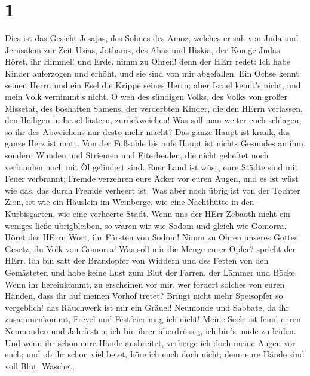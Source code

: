 \hypertarget{section}{%
\section{1}\label{section}}

 Dies ist das Gesicht Jesajas, des Sohnes des Amoz, welches
er sah von Juda und Jerusalem zur Zeit Usias, Jothams, des Ahas und
Hiskia, der Könige Judas.  Höret, ihr Himmel! und Erde, nimm
zu Ohren! denn der HErr redet: Ich habe Kinder auferzogen und erhöht,
und sie sind von mir abgefallen.  Ein Ochse kennt seinen
Herrn und ein Esel die Krippe seines Herrn; aber Israel kennt's nicht,
und mein Volk vernimmt's nicht.  O weh des sündigen Volks,
des Volks von großer Missetat, des boshaften Samens, der verderbten
Kinder, die den HErrn verlassen, den Heiligen in Israel lästern,
zurückweichen!  Was soll man weiter euch schlagen, so ihr
des Abweichens nur desto mehr macht? Das ganze Haupt ist krank, das
ganze Herz ist matt.  Von der Fußsohle bis aufs Haupt ist
nichts Gesundes an ihm, sondern Wunden und Striemen und Eiterbeulen, die
nicht geheftet noch verbunden noch mit Öl gelindert sind. 
Euer Land ist wüst, eure Städte sind mit Feuer verbrannt; Fremde
verzehren eure Äcker vor euren Augen, und es ist wüst wie das, das durch
Fremde verheert ist.  Was aber noch übrig ist von der
Tochter Zion, ist wie ein Häuslein im Weinberge, wie eine Nachthütte in
den Kürbisgärten, wie eine verheerte Stadt.  Wenn uns der
HErr Zebaoth nicht ein weniges ließe übrigbleiben, so wären wir wie
Sodom und gleich wie Gomorra.  Höret des HErrn Wort, ihr
Fürsten von Sodom! Nimm zu Ohren unseres Gottes Gesetz, du Volk von
Gomorra!  Was soll mir die Menge eurer Opfer? spricht der
HErr. Ich bin satt der Brandopfer von Widdern und des Fetten von den
Gemästeten und habe keine Lust zum Blut der Farren, der Lämmer und
Böcke.  Wenn ihr hereinkommt, zu erscheinen vor mir, wer
fordert solches von euren Händen, dass ihr auf meinen Vorhof tretet?
 Bringt nicht mehr Speisopfer so vergeblich! das Räuchwerk
ist mir ein Gräuel! Neumonde und Sabbate, da ihr zusammenkommt, Frevel
und Festfeier mag ich nicht!  Meine Seele ist feind euren
Neumonden und Jahrfesten; ich bin ihrer überdrüssig, ich bin's müde zu
leiden.  Und wenn ihr schon eure Hände ausbreitet, verberge
ich doch meine Augen vor euch; und ob ihr schon viel betet, höre ich
euch doch nicht; denn eure Hände sind voll Blut.  Waschet,

